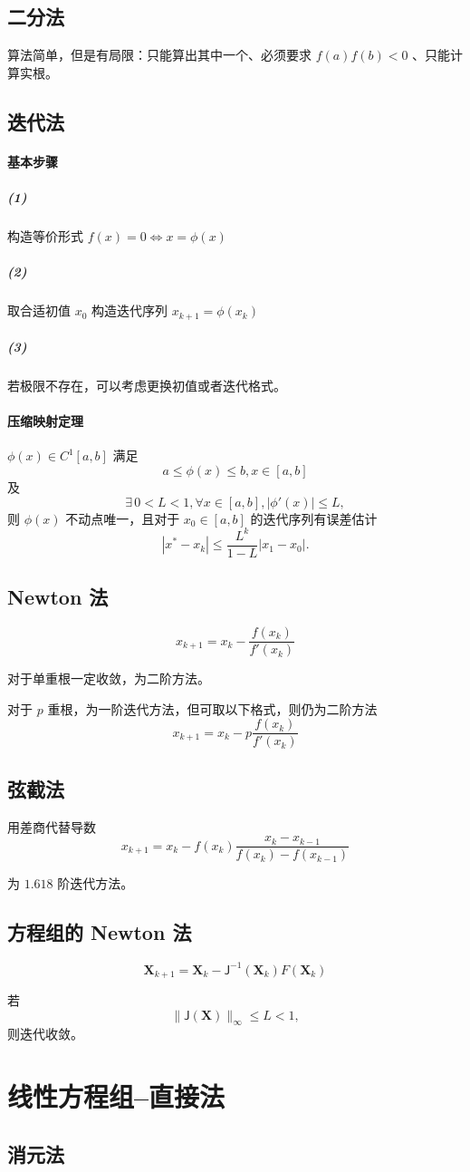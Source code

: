 \documentclass[a4paper,12pt]{article}
\begin{document}
\subsection{二分法}
算法简单，但是有局限：只能算出其中一个、必须要求 $f(a)f(b)<0$ 、只能计算实根。
\subsection{迭代法}
\paragraph{基本步骤}
\subparagraph{(1)}构造等价形式 $f(x)=0\Leftrightarrow x=\phi(x)$
\subparagraph{(2)}取合适初值 $x_0$ 构造迭代序列 $x_{k+1}=\phi(x_k)$
\subparagraph{(3)}若极限不存在，可以考虑更换初值或者迭代格式。
\paragraph{压缩映射定理}
$\phi(x)\in C^1[a,b]$ 满足 
\[
a\le\phi(x)\le b,x\in[a,b]
\] 
及 
\[
\exists\, 0<L<1,\forall x\in[a,b], |\phi'(x)|\le L,
\]
则 $\phi(x)$ 不动点唯一，且对于 $x_0\in[a,b]$ 的迭代序列有误差估计
\[
|x^*-x_k|\le\frac{L^k}{1-L}|x_1-x_0|.
\]
\subsection{Newton 法}
\[
x_{k+1}=x_k-\frac{f(x_k)}{f'(x_k)}
\]\par
对于单重根一定收敛，为二阶方法。\par
对于 $p$ 重根，为一阶迭代方法，但可取以下格式，则仍为二阶方法
\[
x_{k+1}=x_k-p\frac{f(x_k)}{f'(x_k)}
\]
\subsection{弦截法}
用差商代替导数
\[
x_{k+1}=x_k-f(x_k)\frac{x_k-x_{k-1}}{f(x_k)-f(x_{k-1})}
\]\par
为 $1.618$ 阶迭代方法。
\subsection{方程组的 Newton 法}
\[
\mathbf{X}_{k+1}=\mathbf{X}_{k}-\mathsf{J}^{-1}(\mathbf{X}_{k})F(\mathbf{X}_{k})
\]\par
若
\[
\|\mathsf{J}(\mathbf{X})\|_\infty\le L<1,
\]
则迭代收敛。
\section{线性方程组--直接法}
\subsection{消元法}
\end{document}
